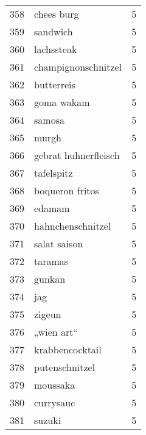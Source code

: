 \begin{tabular}{llr}
358  &                                         chees burg &      5 \\
359  &                                           sandwich &      5 \\
360  &                                         lachssteak &      5 \\
361  &                                champignonschnitzel &      5 \\
362  &                                         butterreis &      5 \\
363  &                                         goma wakam &      5 \\
364  &                                             samosa &      5 \\
365  &                                              murgh &      5 \\
366  &                               gebrat huhnerfleisch &      5 \\
367  &                                         tafelspitz &      5 \\
368  &                                    boqueron fritos &      5 \\
369  &                                             edamam &      5 \\
370  &                                  hahnchenschnitzel &      5 \\
371  &                                       salat saison &      5 \\
372  &                                            taramas &      5 \\
373  &                                             gunkan &      5 \\
374  &                                                jag &      5 \\
375  &                                             zigeun &      5 \\
376  &                                         „wien art“ &      5 \\
377  &                                    krabbencocktail &      5 \\
378  &                                     putenschnitzel &      5 \\
379  &                                           moussaka &      5 \\
380  &                                          currysauc &      5 \\
381  &                                             suzuki &      5 \\

\end{tabular}
